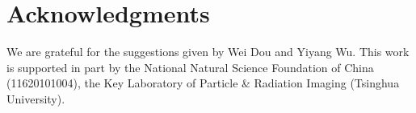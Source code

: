 \section{Acknowledgments}
We are grateful for the suggestions given by Wei Dou and Yiyang Wu. This work is supported in part by the National Natural Science Foundation of China (11620101004), the Key Laboratory of Particle \& Radiation Imaging (Tsinghua University). 
